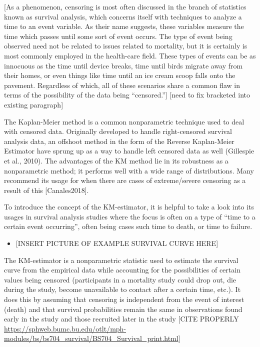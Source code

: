 \documentclass[12pt, twoside]{amherstthesis}
\providecommand{\tightlist}{%
  \setlength{\itemsep}{0pt}\setlength{\parskip}{0pt}}
\begin{document}
{[}As a phenomenon, censoring is most often discussed in the branch of statistics known as survival analysis, which concerns itself with techniques to analyze a time to an event variable. As their name suggests, these variables measure the time which passes until some sort of event occurs. The type of event being observed need not be related to issues related to mortality, but it is certainly is most commonly employed in the health-care field. These types of events can be as innocuous as the time until device breaks, time until birds migrate away from their homes, or even things like time until an ice cream scoop falls onto the pavement. Regardless of which, all of these scenarios share a common flaw in terms of the possibility of the data being ``censored.''{]} {[}need to fix bracketed into existing paragraph{]}

The Kaplan-Meier method is a common nonparametric technique used to deal with censored data. Originally developed to handle right-censored survival analysis data, an offshoot method in the form of the Reverse Kaplan-Meier Estimator have sprung up as a way to handle left censored data as well (Gillespie et al., 2010). The advantages of the KM method lie in its robustness as a nonparametric method; it performs well with a wide range of distributions. Many recommend its usage for when there are cases of extreme/severe censoring as a result of this {[}Canales2018{]}.

To introduce the concept of the KM-estimator, it is helpful to take a look into its usages in survival analysis studies where the focus is often on a type of ``time to a certain event occurring'', often being cases such time to death, or time to failure.
\begin{itemize}
\tightlist
\item
  {[}INSERT PICTURE OF EXAMPLE SURVIVAL CURVE HERE{]}
\end{itemize}
The KM-estimator is a nonparametric statistic used to estimate the survival curve from the empirical data while accounting for the possibilities of certain values being censored (participants in a mortality study could drop out, die during the study, become unavailable to contact after a certain time, etc.). It does this by assuming that censoring is independent from the event of interest (death) and that survival probabilities remain the same in observations found early in the study and those recruited later in the study {[}CITE PROPERLY \url{https://sphweb.bumc.bu.edu/otlt/mph-modules/bs/bs704_survival/BS704_Survival_print.html}{]}
\end{document}
